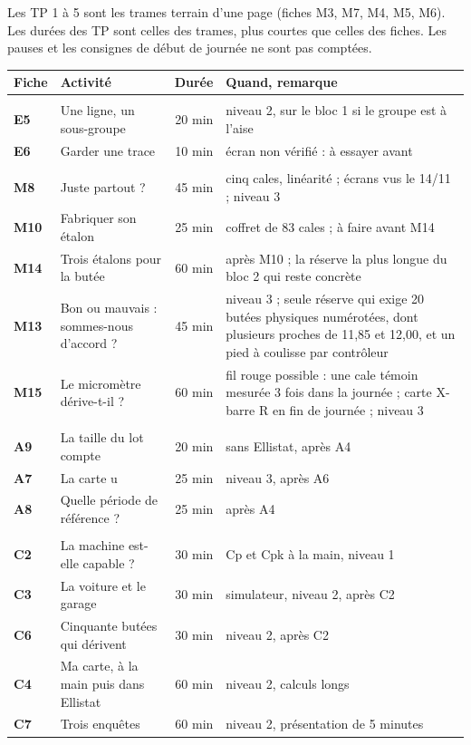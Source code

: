 \documentclass[10pt,a4paper]{article}
\begin{document}
\par\smallskip
\footnotesize Les TP 1 à 5 sont les trames terrain d'une page (fiches M3, M7, M4, M5, M6). Les durées des TP sont celles des trames, plus courtes que celles des fiches. Les pauses et les consignes de début de journée ne sont pas comptées.
\newpage
{}
\renewcommand{\arraystretch}{1.28}\small
\begin{tabularx}{\linewidth}{|>{\bfseries}p{11mm}|>{\raggedright\arraybackslash}p{58mm}|r|>{\raggedright\arraybackslash}X|}\hline
\rowcolor{uimm}\color{white}\textbf{Fiche} & \color{white}\textbf{Activité} & \color{white}\textbf{Durée} & \color{white}\textbf{Quand, remarque}\\\hline
\rowcolor{fond}\multicolumn{4}{|l|}{\textbf{\color{uimm}Ellistat}}\\ \hline
E5 & Une ligne, un sous-groupe & 20 min & niveau 2, sur le bloc 1 si le groupe est à l'aise \\ \hline
E6 & Garder une trace & 10 min & écran non vérifié : à essayer avant \\ \hline
\rowcolor{fond}\multicolumn{4}{|l|}{\textbf{\color{uimm}Instruments}}\\ \hline
M8 & Juste partout ? & 45 min & cinq cales, linéarité ; écrans vus le 14/11 ; niveau 3 \\ \hline
M10 & Fabriquer son étalon & 25 min & coffret de 83 cales ; à faire avant M14 \\ \hline
M14 & Trois étalons pour la butée & 60 min & après M10 ; la réserve la plus longue du bloc 2 qui reste concrète \\ \hline
M13 & Bon ou mauvais : sommes-nous d'accord ? & 45 min & niveau 3 ; seule réserve qui exige 20 butées physiques numérotées, dont plusieurs proches de 11,85 et 12,00, et un pied à coulisse par contrôleur \\ \hline
M15 & Le micromètre dérive-t-il ? & 60 min & fil rouge possible : une cale témoin mesurée 3 fois dans la journée ; carte X-barre R en fin de journée ; niveau 3 \\ \hline
\rowcolor{fond}\multicolumn{4}{|l|}{\textbf{\color{uimm}Attributs}}\\ \hline
A9 & La taille du lot compte & 20 min & sans Ellistat, après A4 \\ \hline
A7 & La carte u & 25 min & niveau 3, après A6 \\ \hline
A8 & Quelle période de référence ? & 25 min & après A4 \\ \hline
\rowcolor{fond}\multicolumn{4}{|l|}{\textbf{\color{uimm}Cartes aux mesures}}\\ \hline
C2 & La machine est-elle capable ? & 30 min & Cp et Cpk à la main, niveau 1 \\ \hline
C3 & La voiture et le garage & 30 min & simulateur, niveau 2, après C2 \\ \hline
C6 & Cinquante butées qui dérivent & 30 min & niveau 2, après C2 \\ \hline
C4 & Ma carte, à la main puis dans Ellistat & 60 min & niveau 2, calculs longs \\ \hline
C7 & Trois enquêtes & 60 min & niveau 2, présentation de 5 minutes \\ \hline
\end{tabularx}
\end{document}
